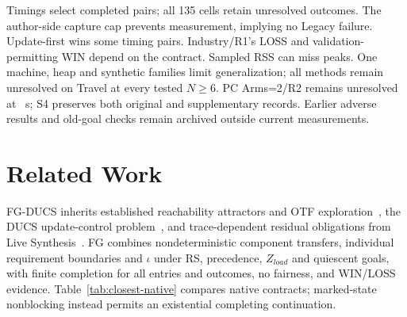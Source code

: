 \documentclass[acmsmall,screen,review,anonymous]{acmart}
\begin{document}
Timings select completed pairs; all 135 cells retain unresolved outcomes. The author-side capture cap prevents measurement, implying no Legacy failure. Update-first wins some timing pairs. Industry/R1's LOSS and validation-permitting WIN depend on the contract. Sampled RSS can miss peaks. One machine, heap and synthetic families limit generalization; all methods remain unresolved on Travel at every tested $N\geq6$. PC Arms=2/R2 remains unresolved at \ADPCCapSeconds{}~s; S4 preserves both original and supplementary records. Earlier adverse results and old-goal checks remain archived outside current measurements.

\section{Related Work}
\label{sec:expressiveness}
FG-DUCS inherits established reachability attractors and OTF exploration~\cite{Cimatti1998StrongPlanning,TripakisAltisen1999,CiolekEtAl2023OTFDCS}, the DUCS update-control problem~\cite{Nahabedian2020}, and trace-dependent residual obligations from Live Synthesis~\cite{FinkbeinerEtAl2022LiveSynthesis}. FG combines nondeterministic component transfers, individual requirement boundaries and $\iota$ under RS, precedence, $Z_{load}$ and quiescent goals, with finite completion for all entries and outcomes, no fairness, and WIN/LOSS evidence. Table~\ref{tab:closest-native} compares native contracts; marked-state nonblocking instead permits an existential completing continuation.
\end{document}
